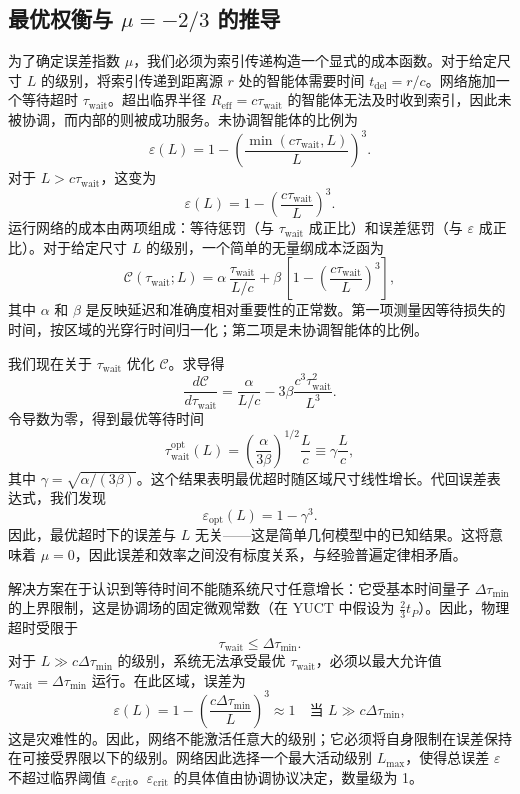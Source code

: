 \documentclass[11pt,a4paper]{article}
\begin{document}
	\subsection{最优权衡与 \(\mu = -2/3\) 的推导}
	为了确定误差指数 \(\mu\)，我们必须为索引传递构造一个显式的成本函数。对于给定尺寸 \(L\) 的级别，将索引传递到距离源 \(r\) 处的智能体需要时间 \(t_{\mathrm{del}} = r/c\)。网络施加一个等待超时 \(\tau_{\mathrm{wait}}\)。超出临界半径 \(R_{\mathrm{eff}} = c\tau_{\mathrm{wait}}\) 的智能体无法及时收到索引，因此未被协调，而内部的则被成功服务。未协调智能体的比例为
	\[
	\varepsilon(L) = 1 - \left(\frac{\min(c\tau_{\mathrm{wait}},L)}{L}\right)^3.
	\]
	对于 \(L > c\tau_{\mathrm{wait}}\)，这变为
	\[
	\varepsilon(L) = 1 - \left(\frac{c\tau_{\mathrm{wait}}}{L}\right)^3.
	\]
	运行网络的成本由两项组成：等待惩罚（与 \(\tau_{\mathrm{wait}}\) 成正比）和误差惩罚（与 \(\varepsilon\) 成正比）。对于给定尺寸 \(L\) 的级别，一个简单的无量纲成本泛函为
	\begin{equation}
		\mathcal{C}(\tau_{\mathrm{wait}}; L) = \alpha\, \frac{\tau_{\mathrm{wait}}}{L/c} + \beta\,\left[1 - \left(\frac{c\tau_{\mathrm{wait}}}{L}\right)^3\right],
		\label{eq:cost}
	\end{equation}
	其中 \(\alpha\) 和 \(\beta\) 是反映延迟和准确度相对重要性的正常数。第一项测量因等待损失的时间，按区域的光穿行时间归一化；第二项是未协调智能体的比例。
	
	我们现在关于 \(\tau_{\mathrm{wait}}\) 优化 \(\mathcal{C}\)。求导得
	\[
	\frac{d\mathcal{C}}{d\tau_{\mathrm{wait}}} = \frac{\alpha}{L/c} - 3\beta \frac{c^3\tau_{\mathrm{wait}}^2}{L^3}.
	\]
	令导数为零，得到最优等待时间
	\[
	\tau_{\mathrm{wait}}^{\mathrm{opt}}(L) = \left(\frac{\alpha}{3\beta}\right)^{1/2} \frac{L}{c} \equiv \gamma \frac{L}{c},
	\]
	其中 \(\gamma = \sqrt{\alpha/(3\beta)}\)。这个结果表明最优超时随区域尺寸线性增长。代回误差表达式，我们发现
	\[
	\varepsilon_{\mathrm{opt}}(L) = 1 - \gamma^3.
	\]
	因此，最优超时下的误差与 \(L\) 无关——这是简单几何模型中的已知结果。这将意味着 \(\mu = 0\)，因此误差和效率之间没有标度关系，与经验普遍定律相矛盾。
	
	解决方案在于认识到等待时间不能随系统尺寸任意增长：它受基本时间量子 \(\Delta\tau_{\min}\) 的上界限制，这是协调场的固定微观常数（在 YUCT 中假设为 \(\frac23 t_P\)）。因此，物理超时受限于
	\[
	\tau_{\mathrm{wait}} \le \Delta\tau_{\min}.
	\]
	对于 \(L \gg c\Delta\tau_{\min}\) 的级别，系统无法承受最优 \(\tau_{\mathrm{wait}}\)，必须以最大允许值 \(\tau_{\mathrm{wait}} = \Delta\tau_{\min}\) 运行。在此区域，误差为
	\[
	\varepsilon(L) = 1 - \left(\frac{c\Delta\tau_{\min}}{L}\right)^3 \approx 1 \quad\text{当 } L \gg c\Delta\tau_{\min},
	\]
	这是灾难性的。因此，网络不能激活任意大的级别；它必须将自身限制在误差保持在可接受界限以下的级别。网络因此选择一个最大活动级别 \(L_{\max}\)，使得总误差 \(\varepsilon\) 不超过临界阈值 \(\varepsilon_{\mathrm{crit}}\)。\(\varepsilon_{\mathrm{crit}}\) 的具体值由协调协议决定，数量级为 1。
	
\end{document}
